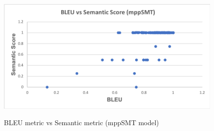 \begin{figure}
\caption{BLEU metric vs Semantic metric (mppSMT model)}
\centering
\includegraphics[scale=0.5]{img/bleuvssemantic_mppSMT.png}
\label{fig:BleuSemMppSMT}
\end{figure}


